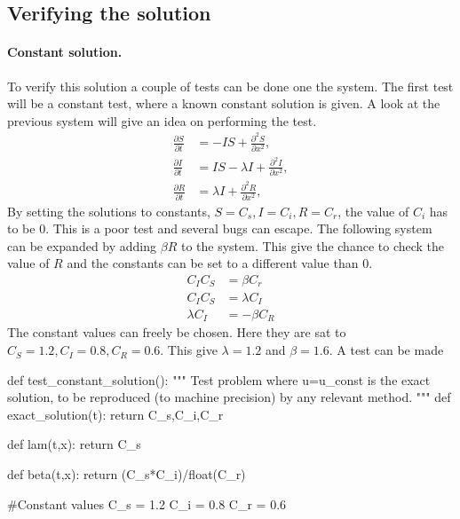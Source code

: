 \documentclass[%
twoside,                 %
final,                   %
10pt]{article}
\begin{document}
\subsection{Verifying the solution}
\paragraph{Constant solution.}
To verify this solution a couple of tests can be done one the system. The first test will be a constant test, where a known constant solution is given. A look at the previous system will give an idea on performing the test.
\begin{equation} \label{eq:simple_non_PDE2}
	\begin{aligned}
	\frac{\partial S}{\partial t} &= -IS + \frac{\partial^2 S}{\partial x^2},\\
	\frac{\partial I}{\partial t} &= IS- \lambda I + \frac{\partial^2 I}{\partial x^2},\\
	\frac{\partial R}{\partial t} &= \lambda I + \frac{\partial^2 R}{\partial x^2},
	\end{aligned}
\end{equation}
By setting the solutions to constants, $S = C_s,I=C_i,R=C_r$, the value of $C_i$ has to be 0. This is a poor test and several bugs can escape. The following system can be expanded by adding $\beta R$ to the system. This give the chance to check the value of $R$ and the constants can be set to a different value than 0.  
\begin{equation} \label{eq:constant_PDE}
	\begin{aligned}
	C_IC_S &= \beta C_r \\
	C_IC_S &= \lambda C_I \\
	\lambda C_I &= -\beta C_R 
	\end{aligned}
\end{equation}
The constant values can freely be chosen. Here they are sat to $C_S = 1.2,C_I=0.8,C_R=0.6$. This give $\lambda=1.2$ and $\beta=1.6$. A test can be made

\bpycod
def test_constant_solution():
    """
    Test problem where u=u_const is the exact solution, to be
    reproduced (to machine precision) by any relevant method.
    """
    def exact_solution(t):
        return C_s,C_i,C_r
    
    def lam(t,x):
        return C_s

    def beta(t,x):
        return (C_s*C_i)/float(C_r)

    #Constant values
    C_s = 1.2
    C_i = 0.8
    C_r = 0.6
    
\end{document}
